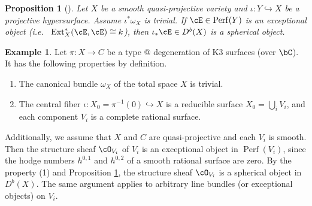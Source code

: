 \documentclass[12pt]{amsart}
\makeatletter
\numberwithin{equation}{section}
\theoremstyle{plain}
\newtheorem{proposition}[theorem]{Proposition}
\theoremstyle{definition}
\newtheorem{example}[theorem]{Example}
\DeclareMathOperator{\Perf}{\mathrm{Perf}}
\DeclareMathOperator{\Ext}{\mathrm{Ext}}
\newcommand*{\rom}[1]{\expandafter\@slowromancap\romannumeral #1@}
\makeatother
\begin{document}
\begin{proposition}[{\cite[Proposition 3.15]{MR1831820}}]\label{prop:exceptional-to-spherical}
    Let $X$ be a smooth quasi-projective variety and $\iota \colon Y \hookrightarrow X$ be a projective hypersurface.
    Assume $\iota^*\omega_X$ is trivial.
    If $\cE \in \Perf(Y)$ is an \emph{exceptional object} (i.e.~ $\Ext^*_X(\cE, \cE) \cong k$), then $\iota_* \cE \in D^b(X)$ is a spherical object.
\end{proposition}
\begin{example}\label{ex:spherical-object-from-K3-degeneration}
    Let $\pi \colon X \to C$ be a type \rom{3} degeneration of K3 surfaces \cite{Kulikov1977,Persson--Pinkham1981} (over $\bC$).
    It has the following properties by definition.
    \begin{enumerate}
        \item The canonical bundle $\omega_X$ of the total space $X$ is trivial.
        \item The central fiber $\iota \colon X_0 = \pi^{-1}(0) \hookrightarrow X$ is a reducible surface $X_0 = \bigcup_i V_i$, and each component $V_i$ is a complete rational surface.
    \end{enumerate}
    Additionally, we assume that $X$ and $C$ are quasi-projective and each $V_i$ is smooth.
    Then the structure sheaf $\cO_{V_i}$ of $V_i$ is an exceptional object in $\Perf(V_i)$, since the hodge numbers $h^{0,1}$ and $h^{0,2}$ of a smooth rational surface are zero.
    By the property (1) and Proposition \ref{prop:exceptional-to-spherical}, the structure sheaf $\cO_{V_i}$ is a spherical object in $D^b(X)$.
    The same argument applies to arbitrary line bundles (or exceptional objects) on $V_i$.


\end{example}
\end{document}
